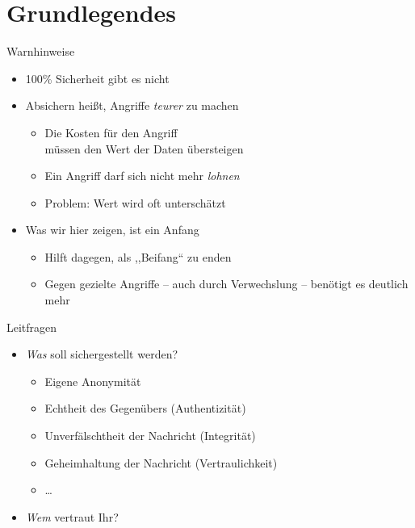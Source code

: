 \section{Grundlegendes}
  \begin{frame}{Warnhinweise}
    \begin{itemize}
      \item 100\% Sicherheit gibt es nicht
      \item Absichern heißt, Angriffe \emph{teurer} zu machen
      \begin{itemize}
      \item Die Kosten für den Angriff\\ müssen den Wert der Daten übersteigen
      \item Ein Angriff darf sich nicht mehr \emph{lohnen}
      \item Problem: Wert wird oft unterschätzt
      \end{itemize}
      \item Was wir hier zeigen, ist ein Anfang
      \begin{itemize}
        \item Hilft dagegen, als ,,Beifang`` zu enden
        \item Gegen gezielte Angriffe -- auch durch Verwechslung -- benötigt es deutlich mehr
      \end{itemize}
    \end{itemize}
  \end{frame}

  \begin{frame}{Leitfragen}
    \begin{itemize}
      \item \emph{Was} soll sichergestellt werden?
        \begin{itemize}
          \item Eigene Anonymität
          \item Echtheit des Gegenübers (Authentizität)
          \item Unverfälschtheit der Nachricht (Integrität)
          \item Geheimhaltung der Nachricht (Vertraulichkeit)
          \item \ldots
        \end{itemize}
      \item \emph{Wem} vertraut Ihr?
    \end{itemize}
  \end{frame}

